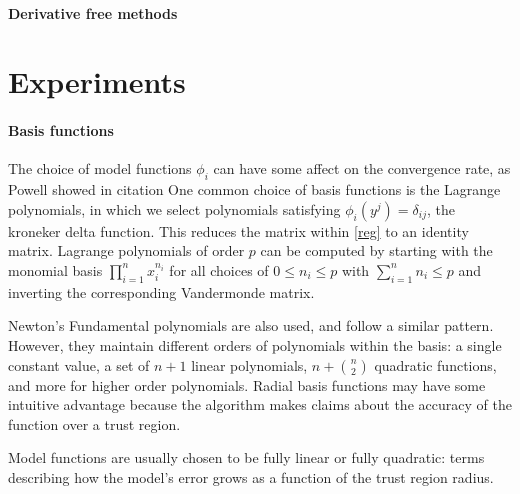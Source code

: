 \paragraph{Derivative free methods}




\section{Experiments}












\paragraph{Basis functions}

The choice of model functions $\phi_i$ can have some affect on the convergence rate, as Powell showed in \color{red}citation\color{black} %
One common choice of basis functions is the Lagrange polynomials, in which we select polynomials satisfying $\phi_{i}(y^j) = \delta_{ij}$, the kroneker delta function.
This reduces the matrix within \ref{reg} to an identity matrix.
Lagrange polynomials of order $p$ can be computed by starting with the monomial basis $\prod_{i=1}^{n} x_i^{n_i}$ for all choices of $0 \le n_i \le p$ with $\sum_{i=1}^n n_i \le p$ and inverting the corresponding Vandermonde matrix.

Newton's Fundamental polynomials are also used, and follow a similar pattern.
However, they maintain different orders of polynomials within the basis:
a single constant value, a set of $n+1$ linear polynomials,
$n + {n \choose 2}$ quadratic functions, and more for higher order polynomials.
Radial basis functions may have some intuitive advantage because the algorithm makes claims about the accuracy of the function over a trust region.


Model functions are usually chosen to be fully linear or fully quadratic: terms describing how the model's error grows as a function of the trust region radius.



